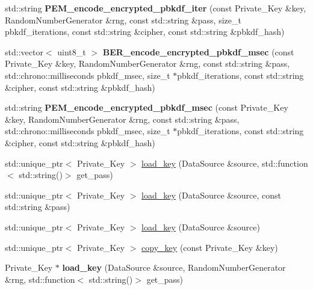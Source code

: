 \begin{DoxyCompactItemize}
std\+::string {\bfseries P\+E\+M\+\_\+encode\+\_\+encrypted\+\_\+pbkdf\+\_\+iter} (const Private\+\_\+\+Key \&key, Random\+Number\+Generator \&rng, const std\+::string \&pass, size\+\_\+t pbkdf\+\_\+iterations, const std\+::string \&cipher, const std\+::string \&pbkdf\+\_\+hash)
\item 
\mbox{\label{namespace_botan_1_1_p_k_c_s8_a76f22dd73d63fead220247977f188827}} 
std\+::vector$<$ uint8\+\_\+t $>$ {\bfseries B\+E\+R\+\_\+encode\+\_\+encrypted\+\_\+pbkdf\+\_\+msec} (const Private\+\_\+\+Key \&key, Random\+Number\+Generator \&rng, const std\+::string \&pass, std\+::chrono\+::milliseconds pbkdf\+\_\+msec, size\+\_\+t $\ast$pbkdf\+\_\+iterations, const std\+::string \&cipher, const std\+::string \&pbkdf\+\_\+hash)
\item 
\mbox{\label{namespace_botan_1_1_p_k_c_s8_a09caf53597ac027e85805b1b6c65bfbc}} 
std\+::string {\bfseries P\+E\+M\+\_\+encode\+\_\+encrypted\+\_\+pbkdf\+\_\+msec} (const Private\+\_\+\+Key \&key, Random\+Number\+Generator \&rng, const std\+::string \&pass, std\+::chrono\+::milliseconds pbkdf\+\_\+msec, size\+\_\+t $\ast$pbkdf\+\_\+iterations, const std\+::string \&cipher, const std\+::string \&pbkdf\+\_\+hash)
\item 
std\+::unique\+\_\+ptr$<$ Private\+\_\+\+Key $>$ \mbox{\hyperlink{namespace_botan_1_1_p_k_c_s8_a4f6f93f2069527bb1be1ba1dea671102}{load\+\_\+key}} (Data\+Source \&source, std\+::function$<$ std\+::string()$>$ get\+\_\+pass)
\item 
std\+::unique\+\_\+ptr$<$ Private\+\_\+\+Key $>$ \mbox{\hyperlink{namespace_botan_1_1_p_k_c_s8_a3d0c7493d43c45f3f6c1f03410132c46}{load\+\_\+key}} (Data\+Source \&source, const std\+::string \&pass)
\item 
std\+::unique\+\_\+ptr$<$ Private\+\_\+\+Key $>$ \mbox{\hyperlink{namespace_botan_1_1_p_k_c_s8_ae1ad1d7d3cac5fbb7edf2ce073887a70}{load\+\_\+key}} (Data\+Source \&source)
\item 
std\+::unique\+\_\+ptr$<$ Private\+\_\+\+Key $>$ \mbox{\hyperlink{namespace_botan_1_1_p_k_c_s8_a01138a33ca808e42f3d927459ea05d46}{copy\+\_\+key}} (const Private\+\_\+\+Key \&key)
\item 
\mbox{\label{namespace_botan_1_1_p_k_c_s8_a1546bdcd156db79cd01e9a05743c7c9c}} 
Private\+\_\+\+Key $\ast$ {\bfseries load\+\_\+key} (Data\+Source \&source, Random\+Number\+Generator \&rng, std\+::function$<$ std\+::string()$>$ get\+\_\+pass)

\end{DoxyCompactItemize}
